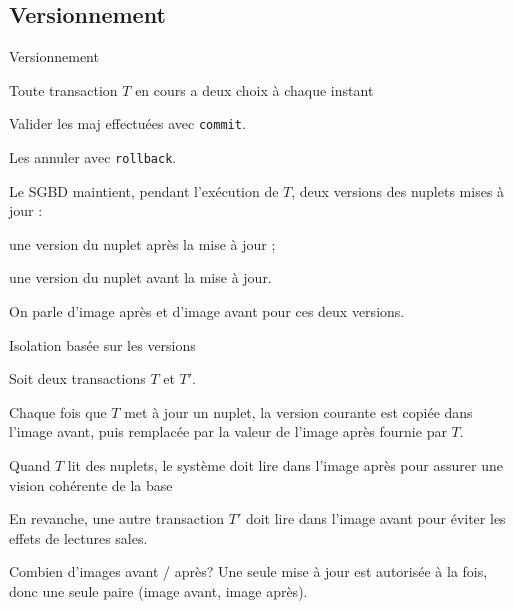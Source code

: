 
\subsection{Versionnement}

\begin{frame}{Versionnement}

Toute transaction $T$ en cours a deux choix à chaque instant

\begin{redbullet}
  \item Valider les maj effectuées avec \texttt{commit}.
  \item Les annuler avec \texttt{rollback}.
\end{redbullet}

\vfill

Le SGBD maintient, pendant l'exécution de $T$, deux versions des nuplets mises à jour :

\begin{redbullet}
   \item une version du nuplet \alert{après} la mise à jour ;
    \item une version du nuplet \alert{avant} la mise à jour.
\end{redbullet}

\vfill
\begin{blocgauche}
On parle \alert{d'image après} et \alert{d'image avant} pour ces deux versions.
\end{blocgauche}
\end{frame}

\begin{frame}{Isolation basée sur les versions}

Soit deux transactions $T$ et $T'$. 

\begin{redbullet}

    \item  Chaque fois que $T$ met à jour un nuplet, la version courante est 
       copiée dans \alert{l’image avant}, puis remplacée par la valeur de \alert{l’image après} fournie par $T$.
        
     \item Quand $T$ lit des nuplets, 
        le système doit lire dans l’image après pour assurer une vision cohérente de la base
      
    \item En revanche,  une autre transaction $T'$ 
        doit lire  dans \alert{l’image avant} pour éviter les effets de lectures sales.
\end{redbullet}


\vfill
\begin{blocgauche}
\alert{Combien d'images avant / après}? Une seule mise à jour est autorisée à la fois, donc
une seule paire (image avant, image après). 
\end{blocgauche}
\end{frame}


